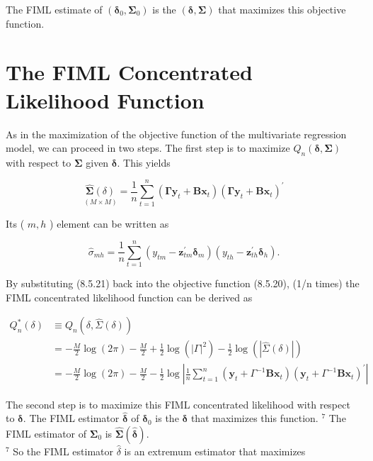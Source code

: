 \documentclass[10pt]{article}
\begin{document}
The FIML estimate of $\left(\boldsymbol{\delta}_{0}, \boldsymbol{\Sigma}_{0}\right)$ is the $(\boldsymbol{\delta}, \boldsymbol{\Sigma})$ that maximizes this objective function.

\section*{The FIML Concentrated Likelihood Function}
As in the maximization of the objective function of the multivariate regression model, we can proceed in two steps. The first step is to maximize $Q_{n}(\boldsymbol{\delta}, \boldsymbol{\Sigma})$ with respect to $\boldsymbol{\Sigma}$ given $\boldsymbol{\delta}$. This yields


\begin{equation*}
\underset{(M \times M)}{\widehat{\mathbf{\Sigma}}(\delta)}=\frac{1}{n} \sum_{t=1}^{n}\left(\boldsymbol{\Gamma} \mathbf{y}_{t}+\mathbf{B} \mathbf{x}_{t}\right)\left(\boldsymbol{\Gamma} \mathbf{y}_{t}+\mathbf{B} \mathbf{x}_{t}\right)^{\prime} \tag{8.5.21}
\end{equation*}


Its ( $m, h$ ) element can be written as


\begin{equation*}
\hat{\sigma}_{m h}=\frac{1}{n} \sum_{t=1}^{n}\left(y_{t m}-\mathbf{z}_{t m}^{\prime} \boldsymbol{\delta}_{m}\right)\left(y_{t h}-\mathbf{z}_{t h}^{\prime} \boldsymbol{\delta}_{h}\right) . \tag{8.5.22}
\end{equation*}


By substituting (8.5.21) back into the objective function (8.5.20), (1/n times) the FIML concentrated likelihood function can be derived as


\begin{align*}
Q_{n}^{*}(\delta) & \equiv Q_{n}(\delta, \widehat{\Sigma}(\delta)) \\
& =-\frac{M}{2} \log (2 \pi)-\frac{M}{2}+\frac{1}{2} \log \left(|\Gamma|^{2}\right)-\frac{1}{2} \log (|\widehat{\Sigma}(\delta)|) \\
& =-\frac{M}{2} \log (2 \pi)-\frac{M}{2}-\frac{1}{2} \log \left|\frac{1}{n} \sum_{t=1}^{n}\left(\mathbf{y}_{t}+\Gamma^{-1} \mathbf{B} \mathbf{x}_{t}\right)\left(\mathbf{y}_{t}+\Gamma^{-1} \mathbf{B} \mathbf{x}_{t}\right)^{\prime}\right| \tag{8.5.23}
\end{align*}


The second step is to maximize this FIML concentrated likelihood with respect to $\boldsymbol{\delta}$. The FIML estimator $\hat{\boldsymbol{\delta}}$ of $\boldsymbol{\delta}_{0}$ is the $\boldsymbol{\delta}$ that maximizes this function. ${ }^{7}$ The FIML estimator of $\mathbf{\Sigma}_{0}$ is $\widehat{\mathbf{\Sigma}}(\hat{\boldsymbol{\delta}})$.\\
${ }^{7}$ So the FIML estimator $\hat{\delta}$ is an extremum estimator that maximizes
\end{document}
